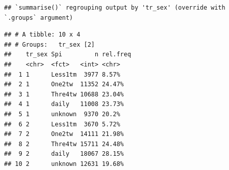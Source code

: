 \documentclass[
]{article}
\newenvironment{Shaded}{\begin{snugshade}}{\end{snugshade}}
\newcommand{\DataTypeTok}[1]{\textcolor[rgb]{0.13,0.29,0.53}{#1}}
\newcommand{\DecValTok}[1]{\textcolor[rgb]{0.00,0.00,0.81}{#1}}
\newcommand{\KeywordTok}[1]{\textcolor[rgb]{0.13,0.29,0.53}{\textbf{#1}}}
\newcommand{\NormalTok}[1]{#1}
\newcommand{\OperatorTok}[1]{\textcolor[rgb]{0.81,0.36,0.00}{\textbf{#1}}}
\newcommand{\OtherTok}[1]{\textcolor[rgb]{0.56,0.35,0.01}{#1}}
\newcommand{\StringTok}[1]{\textcolor[rgb]{0.31,0.60,0.02}{#1}}
\begin{document}
\begin{Shaded}
\end{Shaded}

\begin{verbatim}
## `summarise()` regrouping output by 'tr_sex' (override with `.groups` argument)
\end{verbatim}

\begin{verbatim}
## # A tibble: 10 x 4
## # Groups:   tr_sex [2]
##    tr_sex Spi         n rel.freq
##    <chr>  <fct>   <int> <chr>   
##  1 1      Less1tm  3977 8.57%   
##  2 1      One2tw  11352 24.47%  
##  3 1      Thre4tw 10688 23.04%  
##  4 1      daily   11008 23.73%  
##  5 1      unknown  9370 20.2%   
##  6 2      Less1tm  3670 5.72%   
##  7 2      One2tw  14111 21.98%  
##  8 2      Thre4tw 15711 24.48%  
##  9 2      daily   18067 28.15%  
## 10 2      unknown 12631 19.68%
\end{verbatim}

\begin{Shaded}
\end{Shaded}
\end{document}
